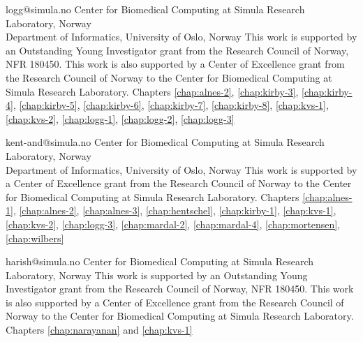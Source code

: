
             {logg@simula.no}
             {Center for Biomedical Computing at Simula Research Laboratory, Norway \\
              Department of Informatics, University of Oslo, Norway}
             {This work is supported by an Outstanding Young
              Investigator grant from the Research Council of Norway,
              NFR 180450. This work is also supported by a Center of
              Excellence grant from the Research Council of Norway to
              the Center for Biomedical Computing at Simula Research
              Laboratory.}
             {Chapters
              \ref{chap:alnes-2}, \ref{chap:kirby-3}, \ref{chap:kirby-4},
              \ref{chap:kirby-5}, \ref{chap:kirby-6}, \ref{chap:kirby-7},
              \ref{chap:kirby-8}, \ref{chap:kvs-1}, \ref{chap:kvs-2},
              \ref{chap:logg-1}, \ref{chap:logg-2}, \ref{chap:logg-3}}



             {kent-and@simula.no}
             {Center for Biomedical Computing at Simula Research Laboratory, Norway \\
              Department of Informatics, University of Oslo, Norway}
             {This work is supported by a Center of Excellence grant
              from the Research Council of Norway to the Center for
              Biomedical Computing at Simula Research Laboratory.}
             {Chapters
              \ref{chap:alnes-1}, \ref{chap:alnes-2}, \ref{chap:alnes-3},
              \ref{chap:hentschel}, \ref{chap:kirby-1}, \ref{chap:kvs-1},
              \ref{chap:kvs-2}, \ref{chap:logg-3}, \ref{chap:mardal-2},
              \ref{chap:mardal-4}, \ref{chap:mortensen}, \ref{chap:wilbers}}


             {harish@simula.no}
             {Center for Biomedical Computing at Simula Research Laboratory, Norway}
             {This work is supported by an Outstanding Young
              Investigator grant from the Research Council of Norway,
              NFR 180450. This work is also supported by a Center of
              Excellence grant from the Research Council of Norway to
              the Center for Biomedical Computing at Simula Research
              Laboratory.}
             {Chapters \ref{chap:narayanan} and \ref{chap:kvs-1}}

